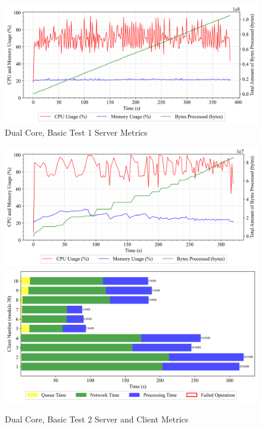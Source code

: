 \begin{figure}[h!t]
    \begin{center}
    \label{Fig:A1.5}
    \caption{Dual Core, Basic Test 1 Server Metrics}
    \includegraphics[width=\x\textwidth]{Chapter4/Results/2c_results/arty-a7-2c_basic_1_20241003_151153.db_server_metrics.png}
    \end{center}
\end{figure}

\begin{figure}[h!t]
    \begin{center}
    \label{Fig:A1.6}
    \caption{Dual Core, Basic Test 2 Server and Client Metrics}
    \includegraphics[width=\x\textwidth]{Chapter4/Results/2c_results/arty-a7-2c_basic_2_20241003_151819.db_server_metrics.png}
    \includegraphics[width=\x\textwidth]{Chapter4/Results/2c_results/arty-a7-2c_basic_2_20241003_151819.db_client_tasks.png}
    \end{center}
\end{figure}

